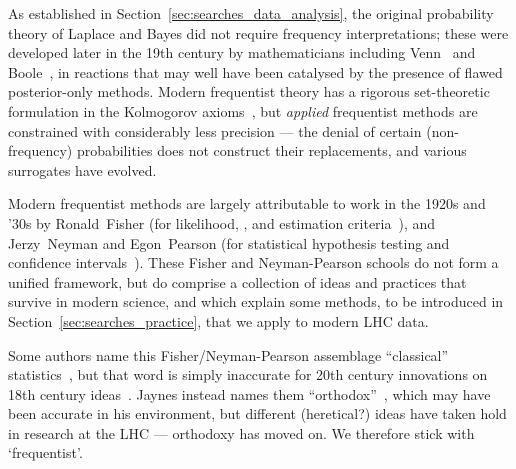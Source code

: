 As established in Section~\ref{sec:searches_data_analysis}, the original
probability theory of Laplace and Bayes did not require frequency
interpretations; these were developed later in the 19th century by
mathematicians including Venn~\cite{venn1866logic} and
Boole~\cite{boole1854investigation}, in reactions that may well have been
catalysed by the presence of flawed posterior-only methods.
Modern frequentist theory has a rigorous set-theoretic formulation in the
Kolmogorov axioms~\cite{
kolomogoroff1933de,
kolomogoroff1950translated,
Neyman1937Outline,
axioms1010038
}, but \emph{applied} frequentist methods are constrained with considerably less
precision --- the denial of certain (non-frequency) probabilities does not
construct their replacements, and various surrogates have evolved.

Modern frequentist methods are largely attributable to work
in the 1920s and '30s by
Ronald~Fisher (for likelihood, \pvalues, and estimation criteria~\cite{
fisher1912fitting,
fisher1915frequency,
fisher1921probable,
fisher1922estimators,
fisher1925smrw,
fisher1956statistical
}),
and Jerzy~Neyman and Egon~Pearson
(for statistical hypothesis testing and confidence intervals~\cite{
neymanpearson1933lemma,
neymanpearson1928max
}).
These Fisher and Neyman-Pearson schools do not form a unified framework, but
do comprise a collection of ideas and practices that survive in modern science,
and which explain some methods, to be introduced in
Section~\ref{sec:searches_practice}, that we apply to modern LHC data.

Some authors name this Fisher/Neyman-Pearson assemblage
``classical'' statistics~\cite{
Neyman1937Outline,
lehmann2011fisher,
Feldman:1997qc
},
but that word is simply inaccurate for 20th century innovations on 18th century
ideas~\cite{
bayes1763lii,
laplace1774stigler
}.
Jaynes instead names them ``orthodox''~\cite{
Jaynes1976intervals,
jaynes2003probability
},
which may have been accurate in his environment, but different
(heretical?) ideas have taken hold in research at the LHC ---
orthodoxy has moved on.
We therefore stick with `frequentist'.

